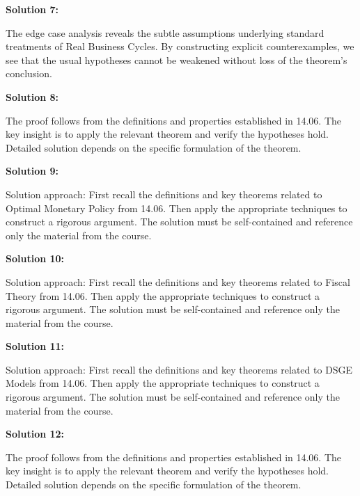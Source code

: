 \documentclass[12pt,a4paper]{exam}
\begin{document}
\vspace{0.5cm}

\textbf{Solution 7:}

The edge case analysis reveals the subtle assumptions underlying standard treatments of Real Business Cycles. By constructing explicit counterexamples, we see that the usual hypotheses cannot be weakened without loss of the theorem's conclusion.

\vspace{0.5cm}

\textbf{Solution 8:}

The proof follows from the definitions and properties established in 14.06. The key insight is to apply the relevant theorem and verify the hypotheses hold. Detailed solution depends on the specific formulation of the theorem.

\vspace{0.5cm}

\textbf{Solution 9:}

Solution approach: First recall the definitions and key theorems related to Optimal Monetary Policy from 14.06. Then apply the appropriate techniques to construct a rigorous argument. The solution must be self-contained and reference only the material from the course.

\vspace{0.5cm}

\textbf{Solution 10:}

Solution approach: First recall the definitions and key theorems related to Fiscal Theory from 14.06. Then apply the appropriate techniques to construct a rigorous argument. The solution must be self-contained and reference only the material from the course.

\vspace{0.5cm}

\textbf{Solution 11:}

Solution approach: First recall the definitions and key theorems related to DSGE Models from 14.06. Then apply the appropriate techniques to construct a rigorous argument. The solution must be self-contained and reference only the material from the course.

\vspace{0.5cm}

\textbf{Solution 12:}

The proof follows from the definitions and properties established in 14.06. The key insight is to apply the relevant theorem and verify the hypotheses hold. Detailed solution depends on the specific formulation of the theorem.
\end{document}
